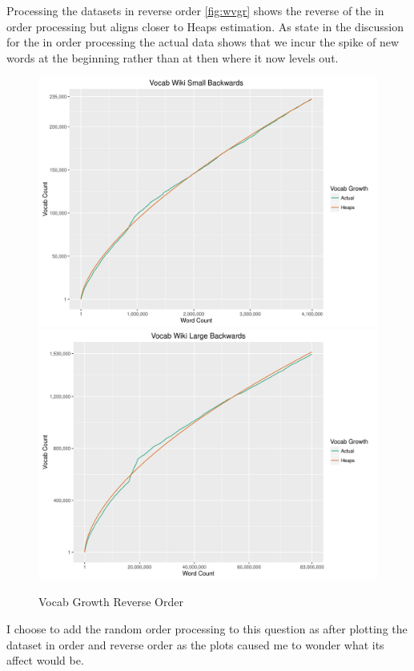 \documentclass[11pt]{article}
\begin{document}
\noindent Processing the datasets in reverse order \autoref{fig:wvgr} shows the reverse of the in order processing but aligns closer to Heaps estimation. As state in the discussion for the in order processing the actual data shows that we incur the spike of new words at the beginning rather than at then where it now levels out.
\begin{figure}[H]
\centering
\includegraphics[scale=0.7]{wikiSmallVGB.png}
\includegraphics[scale=0.7]{wikiLargeVGB.png}
\caption{Vocab Growth Reverse Order}
\label{fig:wvgb}
\end{figure}
\noindent I choose to add the random order processing to this question as after plotting the dataset in order and reverse order as the plots caused me to wonder what its affect would be.
\end{document}

